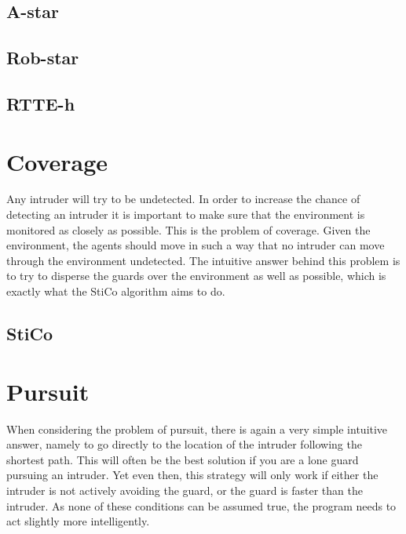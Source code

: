 \documentclass{ba-kecs}
\begin{document}
    \subsection{A-star}
    \label{sec:astar}
		
    
    \subsection{Rob-star}
    \label{sec:Robstar}
		
		
	
	\subsection{RTTE-h}
		


	\section{Coverage}
	\label{sec:coverage}
	Any intruder will try to be undetected. In order to increase the chance of detecting an intruder it is important to make sure that the environment is monitored as closely as possible. This is the problem of coverage. Given the environment, the agents should move in such a way that no intruder can move through the environment undetected. The intuitive answer behind this problem is to try to disperse the guards over the environment as well as possible, which is exactly what the StiCo algorithm aims to do.
	
		\subsection{StiCo}
			

	\section{Pursuit}
	\label{sec:pursuit}
		When considering the problem of pursuit, there is again a very simple intuitive answer, namely to go directly to the location of the intruder following the shortest path. This will often be the best solution if you are a lone guard pursuing an intruder. Yet even then, this strategy will only work if either the intruder is not actively avoiding the guard, or the guard is faster than the intruder. As none of these conditions can be assumed true, the program needs to act slightly more intelligently.
\end{document}
